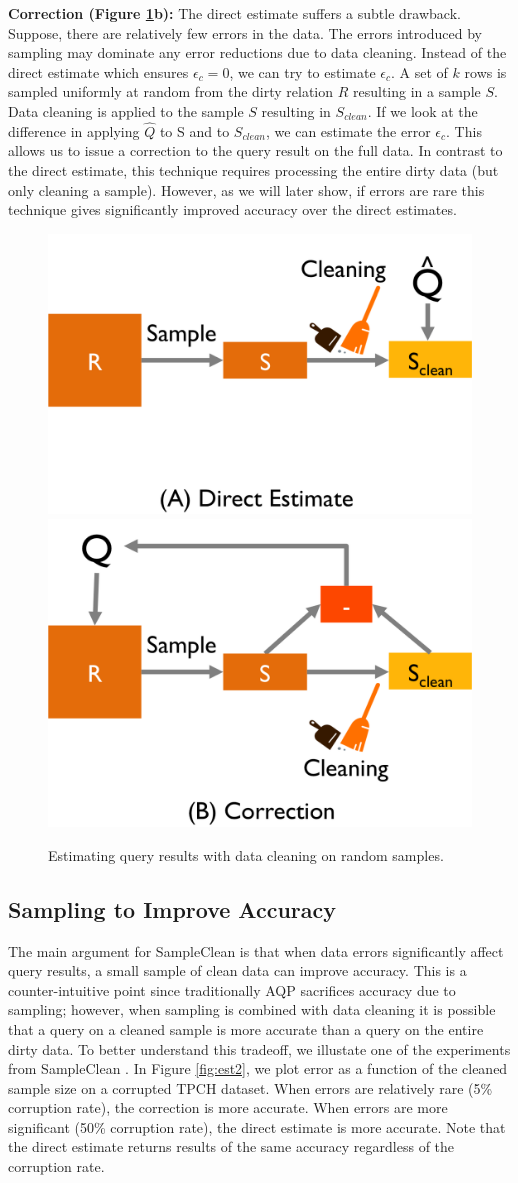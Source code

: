 \vspace{0.5em}
\noindent\textbf{Correction (Figure \ref{fig:est}b): } The direct estimate suffers a subtle drawback. Suppose, there are relatively few errors in the data. The errors introduced by sampling may dominate any error reductions due to data cleaning. Instead of the direct estimate which ensures $\epsilon_c = 0$, we can try to estimate $\epsilon_c$. A set of $k$ rows is sampled uniformly at random from the dirty relation $R$ resulting in a sample $S$. Data cleaning is applied to the sample $S$ resulting in $S_{clean}$. 
If we look at the difference in applying $\widehat{Q}$ to S and to $S_{clean}$, we can estimate the error $\epsilon_c$. 
This allows us to issue a correction to the query result on the full data.
In contrast to the direct estimate, this technique requires processing the entire dirty data (but only cleaning a sample).
However, as we will later show, if errors are rare this technique gives significantly improved accuracy over the direct estimates.

\begin{figure}\centering
\includegraphics[width=.35\columnwidth]{figs/est1b.png}
\hspace{2em}
\includegraphics[width=.35\columnwidth]{figs/est1c.png}
\caption{Estimating query results with data cleaning on random samples. \label{fig:est}}
\end{figure}

\subsection{Sampling to Improve Accuracy}
The main argument for SampleClean is that when data errors significantly affect query results, a small sample of clean data can improve accuracy.
This is a counter-intuitive point since traditionally AQP sacrifices accuracy due to sampling; however, when sampling is combined with data cleaning it is possible that a query on a cleaned sample is more accurate than a query on the entire dirty data.
To better understand this tradeoff, we illustate one of the experiments from SampleClean \cite{wang1999sample}.
In Figure \ref{fig:est2}, we plot error as a function of the cleaned sample size on a corrupted TPCH dataset.
When errors are relatively rare (5\% corruption rate), the correction is more accurate. 
When errors are more significant (50\% corruption rate), the direct estimate is more accurate.
Note that the direct estimate returns results of the same accuracy regardless of the corruption rate. 

